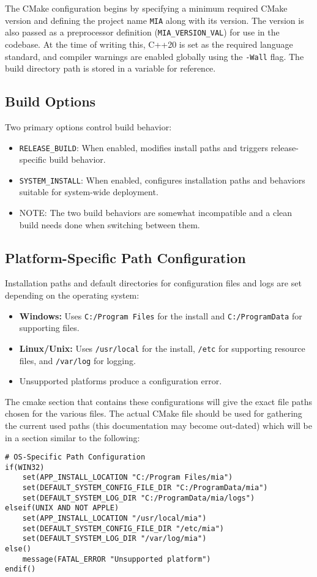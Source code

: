 The CMake configuration begins by specifying a minimum required CMake version and defining the project name \texttt{MIA} along with its version. The version is also passed as a preprocessor definition (\texttt{MIA\_VERSION\_VAL}) for use in the codebase. At the time of writing this, C++20 is set as the required language standard, and compiler warnings are enabled globally using the \texttt{-Wall} flag. The build directory path is stored in a variable for reference.

\subsection{Build Options}

Two primary options control build behavior:
\begin{itemize}
	\item \texttt{RELEASE\_BUILD}: When enabled, modifies install paths and triggers release-specific build behavior.
	\item \texttt{SYSTEM\_INSTALL}: When enabled, configures installation paths and behaviors suitable for system-wide deployment.
	\item NOTE: The two build behaviors are somewhat incompatible and a clean build needs done when switching between them.
\end{itemize}

\subsection{Platform-Specific Path Configuration}

Installation paths and default directories for configuration files and logs are set depending on the operating system:
\begin{itemize}
	\item \textbf{Windows:} Uses \texttt{C:/Program Files} for the install and \texttt{C:/ProgramData} for supporting files.
	\item \textbf{Linux/Unix:} Uses \texttt{/usr/local} for the install, \texttt{/etc} for supporting resource files, and \texttt{/var/log} for logging.
	\item Unsupported platforms produce a configuration error.
\end{itemize}
The cmake section that contains these configurations will give the exact file paths chosen for the various files. The actual CMake file should be used for gathering the current used paths (this documentation may become out-dated) which will be in a section similar to the following:
\begin{lstlisting}[style=shellstyle]
# OS-Specific Path Configuration
if(WIN32)
    set(APP_INSTALL_LOCATION "C:/Program Files/mia")
    set(DEFAULT_SYSTEM_CONFIG_FILE_DIR "C:/ProgramData/mia")
    set(DEFAULT_SYSTEM_LOG_DIR "C:/ProgramData/mia/logs")
elseif(UNIX AND NOT APPLE)
    set(APP_INSTALL_LOCATION "/usr/local/mia")
    set(DEFAULT_SYSTEM_CONFIG_FILE_DIR "/etc/mia")
    set(DEFAULT_SYSTEM_LOG_DIR "/var/log/mia")
else()
    message(FATAL_ERROR "Unsupported platform")
endif()
\end{lstlisting}

